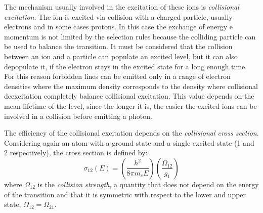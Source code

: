 \documentclass[../main.tex]{subfiles}
\begin{document}
The mechanism usually involved in the excitation of these ions is \emph{collisional excitation}.
The ion is excited via collision with a charged particle, usually electrons and in some cases protons.
In this case the exchange of energy e momentum is not limited by the selection rules because the colliding particle can be used to balance the transition.
It must be considered that the collision between an ion and a particle can populate an excited level, but it can also depopulate it, if the electron stays in the excited state for a long enough time.
For this reason forbidden lines can be emitted only in a range of electron densities where the maximum density corresponds to the density where collisional deexcitation completely balance collisional excitation.
This value depends on the mean lifetime of the level, since the longer it is, the easier the excited ions can be involved in a collision before emitting a photon.

The efficiency of the collisional excitation depends on the \emph{collisional cross section}.
Considering again an atom with a ground state and a single excited state (1 and 2 respectively), the cross section is defined by:
\begin{equation}
    \label{eq:crosssection}
    \sigma_{12}(E) = \left(\frac{h^2}{8\pi m_e E}\right)\left(\frac{\Omega_{12}}{g_1}\right)
\end{equation}
where $\Omega_{12}$ is the \emph{collision strength}, a quantity that does not depend on the energy of the transition and that it is symmetric with respect to the lower and upper state, $\Omega_{12} = \Omega_{21}$.
\end{document}
